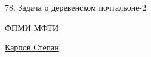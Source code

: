 


    \begin{center}
        \LARGE 78. Задача о деревенском почтальоне-2
        
        \large ФПМИ МФТИ
        
        \href{https://vk.com/stepan_karpov_k}{Карпов Степан}
    \end{center}

    \hypertarget{intro}{}
    \tableofcontents

    \newpage

    

